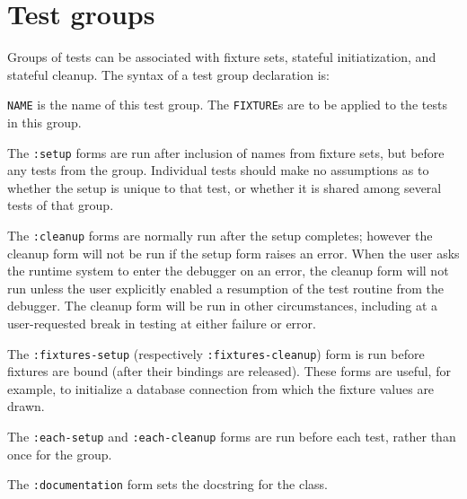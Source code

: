
\section{Test groups}
\label{sec:groups}
Groups of tests can be
associated with fixture sets, stateful initiatization, and stateful
cleanup.  The syntax of a test group declaration
is:

%
\texttt{NAME} is the name of this test group.  The \texttt{FIXTURE}s
are to be applied to the tests in this group.

The \texttt{:setup} forms are run after
inclusion of names from fixture sets, but before any tests from the
group.  Individual tests should make no assumptions as to whether the
setup is unique to that test, or whether it is shared among several
tests of that group.  

The \texttt{:cleanup} forms are
normally run after the setup completes; however the cleanup form will
not be run if the setup form raises an error.  When the user asks the
runtime system to enter the debugger on an error, the cleanup form
will not run unless the user explicitly enabled a resumption of the
test routine from the debugger.  The cleanup form will be run in other
circumstances, including at a user-requested break in testing at
either failure or error.

The
\texttt{:fixtures-setup}
(respectively
\texttt{:fixtures-cleanup})
form is run before fixtures are bound (after their bindings are
released).  These forms are useful, for example, to initialize a
database connection from which the fixture values are drawn.

The \texttt{:each-setup}
and \texttt{:each-cleanup}
forms are run before each test, rather than once for the group.

The \texttt{:documentation}
form sets the docstring for the class.


